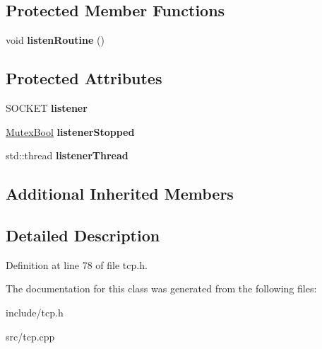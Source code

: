 \subsection*{Protected Member Functions}
\begin{DoxyCompactItemize}
\item 
\hypertarget{classpersonal_robotics_1_1_tcp_server_a4650c957a6fa66fa4f847aa3b0b82f18}{}void {\bfseries listen\+Routine} ()\label{classpersonal_robotics_1_1_tcp_server_a4650c957a6fa66fa4f847aa3b0b82f18}

\end{DoxyCompactItemize}
\subsection*{Protected Attributes}
\begin{DoxyCompactItemize}
\item 
\hypertarget{classpersonal_robotics_1_1_tcp_server_aae4ed861a52d8e3f9b934f2c78434476}{}S\+O\+C\+K\+E\+T {\bfseries listener}\label{classpersonal_robotics_1_1_tcp_server_aae4ed861a52d8e3f9b934f2c78434476}

\item 
\hypertarget{classpersonal_robotics_1_1_tcp_server_a8363a7709a70654a1317f4ab8f927178}{}\hyperlink{classpersonal_robotics_1_1_mutex_type}{Mutex\+Bool} {\bfseries listener\+Stopped}\label{classpersonal_robotics_1_1_tcp_server_a8363a7709a70654a1317f4ab8f927178}

\item 
\hypertarget{classpersonal_robotics_1_1_tcp_server_a59485a6ad32f739a3ecac1dd7bde0542}{}std\+::thread {\bfseries listener\+Thread}\label{classpersonal_robotics_1_1_tcp_server_a59485a6ad32f739a3ecac1dd7bde0542}

\end{DoxyCompactItemize}
\subsection*{Additional Inherited Members}


\subsection{Detailed Description}


Definition at line 78 of file tcp.\+h.



The documentation for this class was generated from the following files\+:\begin{DoxyCompactItemize}
\item 
include/tcp.\+h\item 
src/tcp.\+cpp\end{DoxyCompactItemize}
